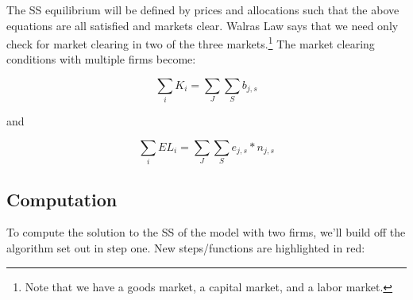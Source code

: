 \documentclass[letterpaper,12pt]{article}
\theoremstyle{definition}
\begin{document}
\begin{spacing}{1.5}
The SS equilibrium will be defined by prices and allocations such that the above equations are all satisfied and markets clear.  Walras Law says that we need only check for market clearing in two of the three markets.\footnote{Note that we have a goods market, a capital market, and a labor market.}  The market clearing conditions with multiple firms become:

\begin{equation}
\label{eqn:cap_mkt_clear}
\sum_{i} K_{i} = \sum_{J}\sum_{S}b_{j,s}
\end{equation}

\noindent\noindent and 

\begin{equation}
\sum_{i} EL_{i} = \sum_{J}\sum_{S}e_{j,s}*n_{j,s}
\end{equation}


\subsection*{Computation}

To compute the solution to the SS of the model with two firms, we'll build off the algorithm set out in step one.  New steps/functions are highlighted in red:


\end{spacing}
\end{document}
